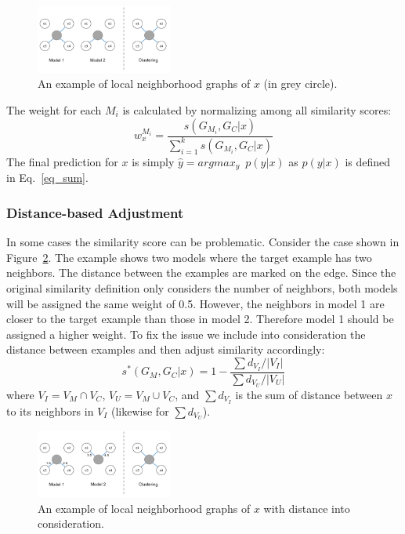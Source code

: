 \begin{figure}[h]
\centering
    \includegraphics[width=0.4\textwidth]{./fig/lwe_graph}
\caption{An example of local neighborhood graphs of $x$ (in grey circle).}
\label{fig:graph}
\end{figure}

The weight for each $M_i$ is calculated by normalizing among all similarity scores:
\begin{equation}\label{eq_norm}
w_{x}^{M_i} = \frac {s(G_{M_i}, G_C|x)} {\sum_{i=1}^k s(G_{M_i}, G_C|x)}
\end{equation}
The final prediction for $x$ is simply $\hat y = argmax_y \enspace p(y|x)$ as $p(y|x)$ is defined in Eq.~\ref{eq_sum}.

\subsubsection{Distance-based Adjustment}
In some cases the similarity score can be problematic. Consider the case shown in Figure~\ref{graph_dist}. 
The example shows two models where the target example has two neighbors.  The distance between the examples are marked on the edge. 
Since the original similarity definition only considers the number of neighbors, both models will be assigned the same weight of 0.5. 
However, the neighbors in model 1 are closer to the target example than those in model 2.  Therefore model 1 should be assigned a higher
weight.
To fix the issue we include into consideration the distance between examples and then adjust similarity accordingly:
\begin{equation}\label{d_sim}
s^\ast(G_M, G_C|x) = 1 - \frac {\sum d_{V_I}/|V_I|} {\sum d_{V_U}/|V_U|}
\end{equation}
where $V_I = V_M \cap V_C$, $V_U = V_M \cup V_C$, and $\sum d_{V_I}$ is the sum of distance between $x$ to its neighbors in $V_I$ (likewise for $\sum d_{V_U}$).

\begin{figure}[h]
\centering
    \includegraphics[width=0.4\textwidth]{./fig/lwe_d_graph}
\caption{An example of local neighborhood graphs of $x$ with distance into consideration.}
\label{graph_dist}
\end{figure}

